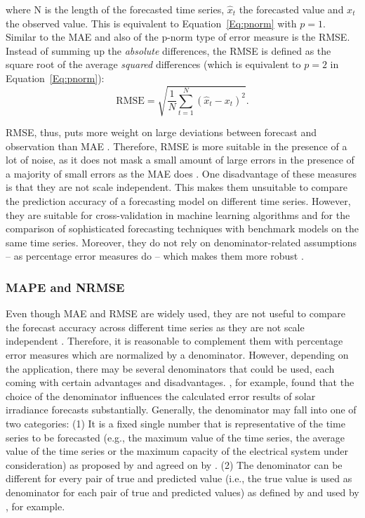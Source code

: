 \noindent where N is the length of the forecasted time series, $\widehat{x}_t$ the forecasted value and $x_t$ the observed value. This is equivalent to Equation~\ref{Eq:pnorm} with $p=1$. Similar to the MAE and also of the p-norm type of error measure is the RMSE. Instead of summing up the \textit{absolute} differences, the RMSE is defined as the square root of the average \textit{squared} differences (which is equivalent to $p=2$ in Equation~\ref{Eq:pnorm}):
%
\begin{equation} \label{Eq:RMSE}
\text{RMSE}=\sqrt{\frac{1}{N}\sum_{t=1}^N\left(\widehat{x}_t-x_t\right)^2}.
\end{equation}

\noindent RMSE, thus, puts more weight on large deviations between forecast and observation than MAE \citep{Meer:2018}. Therefore, RMSE is more suitable in the presence of a lot of noise, as it does not mask a small amount of large errors in the presence of a majority of small errors as the MAE does \citep{Zhang:2015}. One disadvantage of these measures is that they are not scale independent. This makes them unsuitable to compare the prediction accuracy of a forecasting model on different time series. However, they are suitable for cross-validation in machine learning algorithms and for the comparison of sophisticated forecasting techniques with benchmark models on the same time series. Moreover, they do not rely on denominator-related assumptions -- as percentage error measures do -- which makes them more robust \citep{Hoff:2013}.


\subsubsection{MAPE and NRMSE}

Even though MAE and RMSE are widely used, they are not useful to compare the forecast accuracy across different time series as they are not scale independent \citep{Meer:2018}. Therefore, it is reasonable to complement them with percentage error measures which are normalized by a denominator. However, depending on the application, there may be several denominators that could be used, each coming with certain advantages and disadvantages. \citet{Hoff:2013}, for example, found that the choice of the denominator influences the calculated error results of solar irradiance forecasts substantially. Generally, the denominator may fall into one of two categories: (1) It is a fixed single number that is representative of the time series to be forecasted (e.g., the maximum value of the time series, the average value of the time series or the maximum capacity of the electrical system under consideration) as proposed by \citet{Hoff:2013} and agreed on by \citet{Meer:2018}. (2) The denominator can be different for every pair of true and predicted value (i.e., the true value is used as denominator for each pair of true and predicted values) as defined by \citet{Hyndman:2006} and used by \citet{xie:2018}, for example. 

